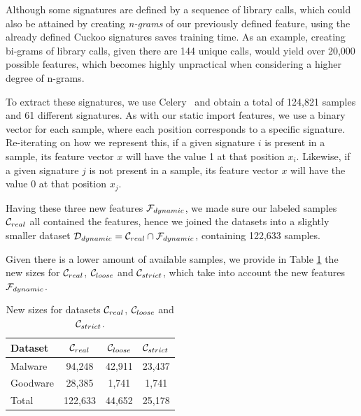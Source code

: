 Although some signatures are defined by a sequence of library calls, which could also be attained by creating \textit{n-grams} of our previously defined feature, using the already defined Cuckoo signatures saves training time.
As an example, creating bi-grams of library calls, given there are 144 unique calls, would yield over 20,000 possible features, which becomes highly unpractical when considering a higher degree of n-grams.

To extract these signatures, we use Celery~\cite{tool:celery} and obtain a total of 124,821 samples and 61 different signatures.
As with our static import features, we use a binary vector for each sample, where each position corresponds to a specific signature. Re-iterating on how we represent this, if a given signature $i$ is present in a sample, its feature vector $x$ will have the value 1 at that position $x_i$. Likewise, if a given signature $j$ is not present in a sample, its feature vector $x$ will have the value 0 at that position $x_j$.

\medskip

Having these three new features $\mathcal{F}_{dynamic}$, we made sure our labeled samples $\mathcal{C}_{real}$ all contained the features, hence we joined the datasets into a slightly smaller dataset $\mathcal{D}_{dynamic} = \mathcal{C}_{real} \cap \mathcal{F}_{dynamic}$, containing 122,633 samples.

Given there is a lower amount of available samples, we provide in Table \ref{tab:dataset_sizes_improved} the new sizes for $\mathcal{C}_{real}$, $\mathcal{C}_{loose}$ and $\mathcal{C}_{strict}$, which take into account the new features $\mathcal{F}_{dynamic}$.

\begin{table}[!htb]
	\renewcommand{\arraystretch}{1.2} %
	\centering
	\begin{tabular}{lccc}
		\toprule
		Dataset			& $\mathcal{C}_{real}$ & $\mathcal{C}_{loose}$ & $\mathcal{C}_{strict}$	\\
		\midrule
		Malware			& 94,248 & 42,911 & 23,437\\
		Goodware		& 28,385 & 1,741 & 1,741\\
		\midrule
		Total			& 122,633 & 44,652 & 25,178\\
		\bottomrule
	\end{tabular}
	\caption{New sizes for datasets $\mathcal{C}_{real}$, $\mathcal{C}_{loose}$ and $\mathcal{C}_{strict}$.}
	\label{tab:dataset_sizes_improved}
\end{table}

